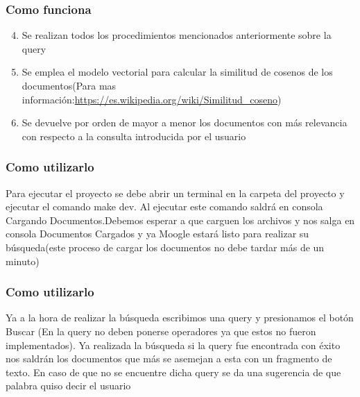\documentclass{beamer}
\begin{document}
\begin{frame}
    \frametitle{Como funciona}
    \begin{enumerate}
    \setcounter{enumi}{3}
        \item Se realizan todos los procedimientos mencionados anteriormente sobre la query
        \item Se emplea el modelo vectorial para calcular la similitud de cosenos de los
        documentos(Para mas información:\url{https://es.wikipedia.org/wiki/Similitud_coseno})
        \item Se devuelve por orden de mayor a menor los documentos con más relevancia con 
        respecto a la consulta introducida por el usuario
    \end{enumerate}
\end{frame}
\begin{frame}
    \frametitle{Como utilizarlo}
    Para ejecutar el proyecto se debe abrir un terminal en la carpeta del proyecto y ejecutar
    el comando make dev. Al ejecutar este comando saldrá en consola Cargando Documentos.Debemos
    esperar a que carguen los archivos y nos salga en consola Documentos Cargados y ya Moogle 
    estará listo para realizar su búsqueda(este proceso de cargar los documentos no debe tardar
    más de un minuto)
\end{frame}
\begin{frame}
        \frametitle{Como utilizarlo}
        Ya a la hora de realizar la búsqueda escribimos una query y presionamos el botón Buscar
        (En la query no deben ponerse operadores ya que estos no fueron implementados). Ya realizada
        la búsqueda si la query fue encontrada con éxito nos saldrán los documentos que más se 
        asemejan a esta con un fragmento de texto. En caso de que no se encuentre dicha query se 
        da una sugerencia de que palabra quiso decir el usuario
\end{frame}    
\end{document}
